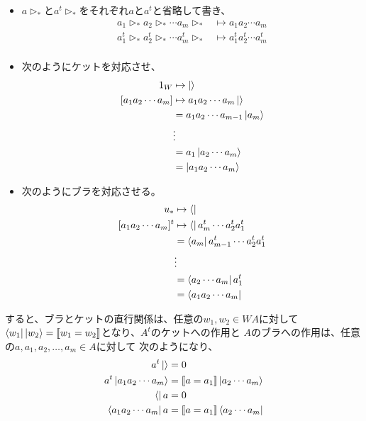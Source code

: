 		\begin{itemize}\setlength{\itemsep}{-1mm} %
			\item $a\rhd_*$と$a^t\rhd_*$をそれぞれ$a$と$a^t$と省略して書き、
			\begin{equation*}\begin{split} %
				a_1\rhd_*a_2\rhd_*\cdots a_m\rhd_* &\mapsto a_1a_2\cdots a_m \\
				a_1^t\rhd_*a_2^t\rhd_*\cdots a_m^t\rhd_* &\mapsto a_1^t a_2^t \cdots a_m^t \\
			\end{split}\end{equation*} %
			\item 次のようにケットを対応させ、
			\begin{equation*}\begin{split} %
				1_W &\mapsto \ket{} \\
				[a_1a_2\cdots a_m] &\mapsto a_1a_2\cdots a_m\ket{} \\
				&= a_1a_2\cdots a_{m-1}\ket{a_m} \\
				&\vdots \\
				&= a_1\ket{a_2\cdots a_m} \\
				&= \ket{a_1a_2\cdots a_m} \\
			\end{split}\end{equation*} %
			\item 次のようにブラを対応させる。
			\begin{equation*}\begin{split} %
				u_* &\mapsto \bra{} \\
				[a_1a_2\cdots a_m]^t 
				&\mapsto \bra{}a_m^t\cdots a_2^t a_1^t \\
				&= \bra{a_m}a_{m-1}^t\cdots a_2^t a_1^t \\
				&\vdots \\
				&= \bra{a_2\cdots a_m}a_1^t \\
				&= \bra{a_1a_2\cdots a_m} \\
			\end{split}\end{equation*} %
		\end{itemize} %
		すると、ブラとケットの直行関係は、任意の$w_1,w_2\in WA$に対して
		$\mathinner{\langle{w_1}|}\mathinner{|{w_2}\rangle}=[\![w_1=w_2]\!]$となり、$A^t$のケットへの作用と
		$A$のブラへの作用は、任意の$a,a_1,a_2,\dots,a_m\in A$に対して
		次のようになり、
		\begin{equation*}\begin{split} %
			a^t\ket{} &= 0 \\
			a^t\ket{a_1a_2\cdots a_m} &= \jump{a=a_1}\ket{a_2\cdots a_m} \\
			\bra{}a &= 0 \\
			\bra{a_1a_2\cdots a_m}a &= \jump{a=a_1}\bra{a_2\cdots a_m} \\
		\end{split}\end{equation*} %
